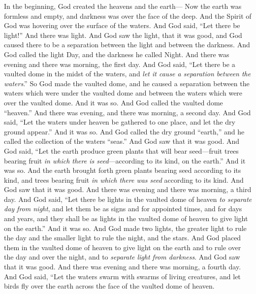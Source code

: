 
\begin{biblechapter} %
 In the beginning, God created the heavens and the earth—
\verse Now the earth was formless and empty, and darkness was over the face of the deep. And the Spirit of God was hovering over the surface of the waters.
\verse And God said, “Let there be light!” And there was light.
\verse And God saw the light, that it was good, and God caused there to be a separation between the light and between the darkness.
\verse And God called the light Day, and the darkness he called Night. And there was evening and there was morning, the first day.
\verse And God said, “Let there be a vaulted dome in the midst of the waters, and \textit{let it cause a separation between the waters}.”
\verse So God made the vaulted dome, and he caused a separation between the waters which were under the vaulted dome and between the waters which were over the vaulted dome. And it was so.
\verse And God called the vaulted dome “heaven.” And there was evening, and there was morning, a second day.
\verse And God said, “Let the waters under heaven be gathered to one place, and let the dry ground appear.” And it was so.
\verse And God called the dry ground “earth,” and he called the collection of the waters “seas.” And God saw that it was good.
\verse And God said, “Let the earth produce green plants that will bear seed—fruit trees bearing fruit \textit{in which there is seed}—according to its kind, on the earth.” And it was so.
\verse And the earth brought forth green plants bearing seed according to its kind, and trees bearing fruit \textit{in which there was seed} according to its kind. And God saw that it was good.
\verse And there was evening and there was morning, a third day.
\verse And God said, “Let there be lights in the vaulted dome of heaven \textit{to separate day from night}, and let them be as signs and for appointed times, and for days and years,
\verse and they shall be as lights in the vaulted dome of heaven to give light on the earth.” And it was so.
\verse And God made two lights, the greater light to rule the day and the smaller light to rule the night, and the stars.
\verse And God placed them in the vaulted dome of heaven to give light on the earth
\verse and to rule over the day and over the night, and to \textit{separate light from darkness}. And God saw that it was good.
\verse And there was evening and there was morning, a fourth day.
\verse And God said, “Let the waters swarm with swarms of living creatures, and let birds fly over the earth across the face of the vaulted dome of heaven.

\end{biblechapter}
